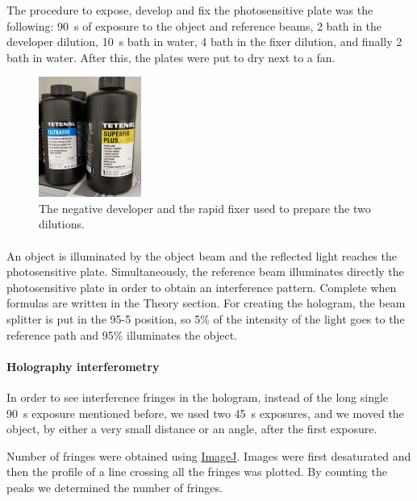 \documentclass[11pt,a4paper]{article}
\begin{document}
The procedure to expose, develop and fix the photosensitive plate was the following: \SI{90}{\second} of exposure to the object and reference beams, \SI{2}{\min} bath in the developer dilution, \SI{10}{\second} bath in water, \SI{4}{\min} bath in the fixer dilution, and finally \SI{2}{\min} bath in water. After this, the plates were put to dry next to a fan.

\begin{figure}[ht]
\centering
\includegraphics[width=0.3\textwidth]{Chemicals}
\caption{The negative developer and the rapid fixer used to prepare the two dilutions.}
\label{fig:chemicals}
\end{figure}

\paragraph{}
An object is illuminated by the object beam and the reflected light reaches the photosensitive plate. Simultaneously, the reference beam illuminates directly the photosensitive plate in order to obtain an interference pattern. {\color{red}Complete when formulas are written in the Theory section.} For creating the hologram, the beam splitter is put in the 95-5 position, so 5\% of the intensity of the light goes to the reference path and 95\% illuminates the object.

\paragraph{Holography interferometry}
In order to see interference fringes in the hologram, instead of the long single \SI{90}{\second} exposure mentioned before, we used two \SI{45}{\second} exposures, and we moved the object, by either a very small distance or an angle, after the first exposure.

Number of fringes were obtained using \href{https://imagej.net/}{ImageJ}. Images were first desaturated and then the profile of a line crossing all the fringes was plotted. By counting the peaks we determined the number of fringes.
\end{document}
